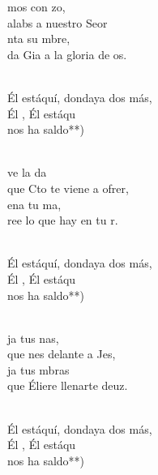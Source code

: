\begin{cancion}%
	mos con zo,\\
	alabs a nuestro Seor\\
	nta su mbre, \\
	da Gia a la gloria de os.\\\jump\\
	\begin{chorus}%
	Él estáquí, dondaya dos más,\\
	Él , Él estáqu    \\
	nos ha saldo**)\\
	\end{chorus}%
	\jump\\
	ve la da \\
	que Cto te viene a ofrer,\\
	ena tu ma, \\
	ree lo que hay en tu r.\\\jump\\
	\begin{chorus}%
	Él estáquí, dondaya dos más,\\
	Él , Él estáqu    \\
	nos ha saldo**)\\
	\end{chorus}%
	\jump\\
	ja tus nas, \\
	que nes delante a Jes, \\
	ja tus mbras \\
	que Éliere llenarte deuz.\\\jump\\
	\begin{chorus}%
	Él estáquí, dondaya dos más,\\
	Él , Él estáqu    \\
	nos ha saldo**)\\
	\end{chorus}%
	\jump\\
\end{cancion}%
